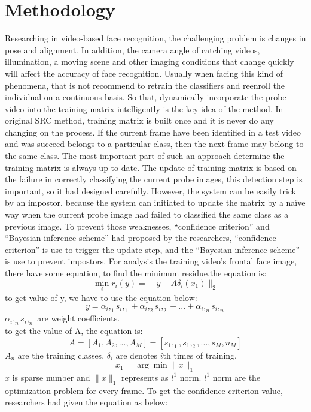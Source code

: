 \documentclass[12pt]{article}
\begin{document}
\section{Methodology}
\hspace{1cm}Researching in video-based face recognition, the challenging problem is changes in pose and alignment. In addition, the camera angle of catching videos, illumination, a moving scene and other imaging conditions that change quickly will affect the accuracy of face recognition. Usually when facing this kind of phenomena, that is not recommend to retrain the classifiers and reenroll the individual on a continuous basis. So that, dynamically incorporate the probe video into the training matrix intelligently is the key idea of the method. In original SRC method, training matrix is built once and it is never do any changing on the process. If the current frame have been identified in a test video and was succeed belongs to a particular class, then the next frame may belong to the same class. The most important part of such an approach determine the training matrix is always up to date. The update of training matrix is based on the failure in correctly classifying the current probe images, this detection step is important, so it had designed carefully. However, the system can be easily trick by an impostor, because the system can initiated to update the matrix by a naïve way when the current probe image had failed to classified the same class as a previous image. To prevent those weaknesses, “confidence criterion” and “Bayesian inference scheme” had proposed by the researchers, “confidence criterion” is use to trigger the update step, and the “Bayesian inference scheme” is use to prevent impostors. For analysis the training video’s frontal face image, there have some equation, to find the minimum residue,the equation is:
\[\min_{i} r_{i}(y) = \parallel y - A\delta_{i} (x_1) \parallel_2\]
to get value of y, we have to use the equation below:
\[y = \alpha_{i},_1s_{i},_1 + \alpha_{i},_2s_{i},_2 + ... + \alpha_{i},_ns_{i},_n\]
$\alpha_{i},_ns_{i},_n $ are weight coefficients.\\
to get the value of A, the equation is:
\[ A=[A_1 , A_2 , ... , A_M] = [s_1,_1,s_1,_2,...,s_M,n_M]\]
$ A_n$ are the training classes.
$\delta_{i}$ are denotes $i$th times of training.
\[x_1 = \arg \min\parallel x \parallel _1\]
$x$ is sparse number and $\parallel x \parallel _1$ represents as $l^1$ norm. $l^1$ norm are the optimization problem for every frame.
To get the confidence criterion value, researchers  had given the equation as below:
\end{document}
